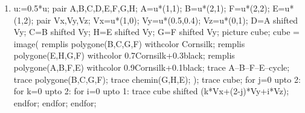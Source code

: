 \begin{exercice*}
\begin{multicols}{2}
\begin{enumerate}
            \item
            \begin{Geometrie}[CoinHD={(5u,4u)}]
                u:=0.5*u;
                pair A,B,C,D,E,F,G,H;
                A=u*(1,1);
                B=u*(2,1);
                F=u*(2,2);
                E=u*(1,2);
                pair Vx,Vy,Vz;
                Vx=u*(1,0);
                Vy=u*(0.5,0.4);
                Vz=u*(0,1);
                D=A shifted Vy;
                C=B shifted Vy;
                H=E shifted Vy;
                G=F shifted Vy;
                picture cube;
                cube = image(
                    remplis polygone(B,C,G,F) withcolor Cornsilk;
                    remplis polygone(E,H,G,F) withcolor 0.7Cornsilk+0.3black;
                    remplis polygone(A,B,F,E) withcolor 0.9Cornsilk+0.1black;
                    trace A--B--F--E--cycle;
                    trace polygone(B,C,G,F);
                    trace chemin(G,H,E);
                );        
                trace cube;
                for j=0 upto 2:
                    for k=0 upto 2:
                        for i=0 upto 1:
                            trace cube shifted (k*Vx+(2-j)*Vy+i*Vz);
                        endfor;
                    endfor;
                endfor;
            \end{Geometrie}
        \end{enumerate}
    \end{multicols}
\end{exercice*}
